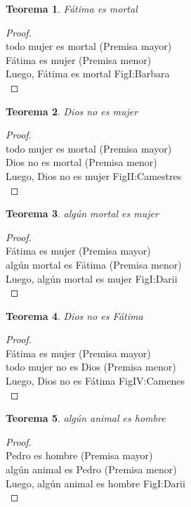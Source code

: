 ﻿\documentclass[12pt]{book}
\newtheorem{theorem}{Teorema}[chapter]
\newtheorem{proof}{Demostración}
\begin{document}
\begin{theorem}
Fátima es mortal
\label{th: 39}
\end{theorem}\begin{proof}\\todo mujer es mortal	 (Premisa mayor) \\Fátima es mujer	 (Premisa menor) \\Luego, Fátima es mortal	FigI:Barbara \\ \end{proof}
\begin{theorem}
Dios no es mujer
\label{th: 40}
\end{theorem}\begin{proof}\\todo mujer es mortal	 (Premisa mayor) \\Dios no es mortal	 (Premisa menor) \\Luego, Dios no es mujer	FigII:Camestres \\ \end{proof}
\begin{theorem}
algún mortal es mujer
\label{th: 41}
\end{theorem}\begin{proof}\\Fátima es mujer	 (Premisa mayor) \\algún mortal es Fátima	 (Premisa menor) \\Luego, algún mortal es mujer	FigI:Darii \\ \end{proof}
\begin{theorem}
Dios no es Fátima
\label{th: 42}
\end{theorem}\begin{proof}\\Fátima es mujer	 (Premisa mayor) \\todo mujer no es Dios	 (Premisa menor) \\Luego, Dios no es Fátima	FigIV:Camenes \\ \end{proof}
\begin{theorem}
algún animal es hombre
\label{th: 43}
\end{theorem}\begin{proof}\\Pedro es hombre	 (Premisa mayor) \\algún animal es Pedro	 (Premisa menor) \\Luego, algún animal es hombre	FigI:Darii \\ \end{proof}
\end{document}
